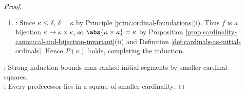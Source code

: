\begin{theorem}
\begin{proof}
\begin{enumerate}[label=(\roman*)]
If $\lambda$ is infinite, then $\abs{\lambda\times\lambda}=\lambda<\kappa$ by induction hypothesis. In either case, $\abs{\lambda\times\lambda}<\kappa$, contradicting $\kappa\leq\abs{\lambda\times\lambda}$; hence $\kappa\not<\delta$.
\item {}: Since $\kappa\leq\delta$, $\delta=\kappa$ by Principle \ref{princ:ordinal-foundations}(i). Thus $f$ is a bijection $\kappa\to\kappa\times\kappa$, so $\abs{\kappa\times\kappa}=\kappa$ by Proposition \ref{prop:cardinality-canonical-and-bijection-invariant}(ii) and Definition \ref{def:cardinals-as-initial-ordinals}. Hence $P(\kappa)$ holds, completing the induction.
\end{enumerate}
: Strong induction bounds max-ranked initial segments by smaller cardinal squares.\\
: Every predecessor lies in a square of smaller cardinality.
\end{proof}
\end{theorem}

